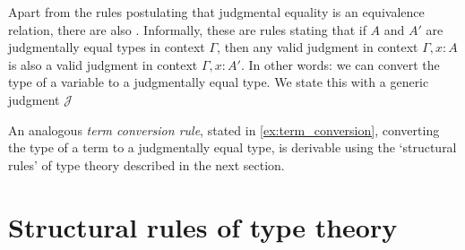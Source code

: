 Apart from the rules postulating that judgmental equality is an equivalence relation, there are also .
Informally, these are rules stating that if $A$ and $A'$ are judgmentally equal types in context $\Gamma$, then any valid judgment in context $\Gamma,x:A$ is also a valid judgment in context $\Gamma,x:A'$. In other words: we can convert the type of a variable to a judgmentally equal type. We state this with a generic judgment $\mathcal{J}$
\begin{prooftree}
\end{prooftree}
An analogous \emph{term conversion rule}, stated in \cref{ex:term_conversion}, converting the type of a term to a judgmentally equal type, is derivable using the `structural rules' of type theory described in the next section.


\section{Structural rules of type theory}


